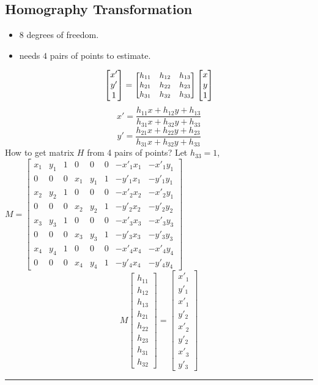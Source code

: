 \subsection{Homography Transformation}
\begin{itemize}
  \item $8$ degrees of freedom.
  \item needs $4$ pairs of points to estimate.
\end{itemize}
\[\begin{bmatrix}
  x'\\
  y'\\
  1
\end{bmatrix}=
{\small
\begin{bmatrix}
  h_{11} & h_{12} & h_{13}\\
  h_{21} & h_{22} & h_{23}\\
  h_{31} & h_{32} & h_{33}
\end{bmatrix}
}
\begin{bmatrix}
  x\\
  y\\
  1
\end{bmatrix}
\]
\[
x' = \frac{h_{11}x + h_{12}y + h_{13}}{h_{31}x + h_{32}y + h_{33}}
\]
\[
y' = \frac{h_{21}x + h_{22}y + h_{23}}{h_{31}x + h_{32}y + h_{33}}
\]
How to get matrix $H$ from 4 pairs of points?
Let $h_{33}=1$,
$ M =
\begin{bmatrix}
  x_1 & y_1 & 1 & 0 & 0 & 0 & {-x'_1x_1} & {-x'_1 y_1}\\
  0 & 0 & 0 & x_1 & y_1 & 1 & {-y'_1x_1} & {-y'_1 y_1}\\
  x_2 & y_2 & 1 & 0 & 0 & 0 & {-x'_2x_2} & {-x'_2 y_1}\\
  0 & 0 & 0 & x_2 & y_2 & 1 & {-y'_2x_2} & {-y'_2 y_2}\\
  x_3 & y_3 & 1 & 0 & 0 & 0 & {-x'_3x_3} & {-x'_3 y_3}\\
  0 & 0 & 0 & x_3 & y_3 & 1 & {-y'_3x_3} & {-y'_3 y_3}\\
  x_4 & y_4 & 1 & 0 & 0 & 0 & {-x'_4x_4} & {-x'_4 y_4}\\
  0 & 0 & 0 & x_4 & y_4 & 1 & {-y'_4x_4} & {-y'_4 y_4}
\end{bmatrix}
$
\[ M
\begin{bmatrix}
  h_{11}\\
  h_{12}\\
  h_{13}\\
  h_{21}\\
  h_{22}\\
  h_{23}\\
  h_{31}\\
  h_{32}
\end{bmatrix}
=
\begin{bmatrix}
  x'_1\\
  y'_1\\
  x'_1\\
  y'_2\\
  x'_2\\
  y'_2\\
  x'_3\\
  y'_3
\end{bmatrix}
\]

\hrule
